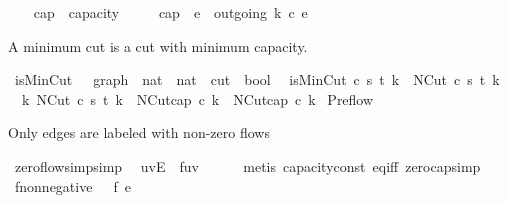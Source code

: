 \begin{isabellebody}
\begin{isamarkuptext}
\end{isamarkuptext}\isamarkuptrue%
\ \ \isamarkupfalse%
\ cap\ {\isacharcolon}{\isacharcolon}\ {\isachardoublequoteopen}{\isacharprime}capacity{\isachardoublequoteclose}\isanewline
\ \ \ \ \ {\isachardoublequoteopen}cap\ {\isasymequiv}\ {\isacharparenleft}{\isasymSum}e\ {\isasymin}\ outgoing{\isacharprime}\ k{\isachardot}\ c\ e{\isacharparenright}{\isachardoublequoteclose}\isanewline
{}\isamarkupfalse%
%
\begin{isamarkuptext}%
A minimum cut is a cut with minimum capacity.%
\end{isamarkuptext}\isamarkuptrue%
\isamarkupfalse%
\ isMinCut\ {\isacharcolon}{\isacharcolon}\ {\isachardoublequoteopen}{\isacharunderscore}\ graph\ {\isasymRightarrow}\ nat\ {\isasymRightarrow}\ nat\ {\isasymRightarrow}\ cut\ {\isasymRightarrow}\ bool{\isachardoublequoteclose}\ \isanewline
{}\ {\isachardoublequoteopen}isMinCut\ c\ s\ t\ k\ {\isasymequiv}\ NCut\ c\ s\ t\ k\ {\isasymand}\isanewline
\ \ {\isacharparenleft}{\isasymforall}k{\isacharprime}{\isachardot}\ NCut\ c\ s\ t\ k{\isacharprime}\ {\isasymlongrightarrow}\ NCut{\isachardot}cap\ c\ k\ {\isasymle}\ NCut{\isachardot}cap\ c\ k{\isacharprime}{\isacharparenright}{\isachardoublequoteclose}%
\isamarkuptrue%
%
\isamarkuptrue%
\isamarkupfalse%
\ Preflow\ \isanewline
{}%
\begin{isamarkuptext}%
Only edges are labeled with non-zero flows%
\end{isamarkuptext}\isamarkuptrue%
\isamarkupfalse%
\ zero{\isacharunderscore}flow{\isacharunderscore}simp{\isacharbrackleft}simp{\isacharbrackright}{\isacharcolon}\isanewline
\ \ {\isachardoublequoteopen}{\isacharparenleft}u{\isacharcomma}v{\isacharparenright}{\isasymnotin}E\ {\isasymLongrightarrow}\ f{\isacharparenleft}u{\isacharcomma}v{\isacharparenright}\ {\isacharequal}\ {}{\isachardoublequoteclose}\isanewline
%
\isadelimproof
\ \ %
\endisadelimproof
%
\isatagproof
{}\isamarkupfalse%
\ {\isacharparenleft}metis\ capacity{\isacharunderscore}const\ eq{\isacharunderscore}iff\ zero{\isacharunderscore}cap{\isacharunderscore}simp{\isacharparenright}%
\endisatagproof
{\isafoldproof}%
%
\isadelimproof
\isanewline
%
\endisadelimproof
\isanewline
{}\isamarkupfalse%
\ f{\isacharunderscore}non{\isacharunderscore}negative{\isacharcolon}\ {\isachardoublequoteopen}{}\ {\isasymle}\ f\ e{\isachardoublequoteclose}\isanewline

\end{isabellebody}
